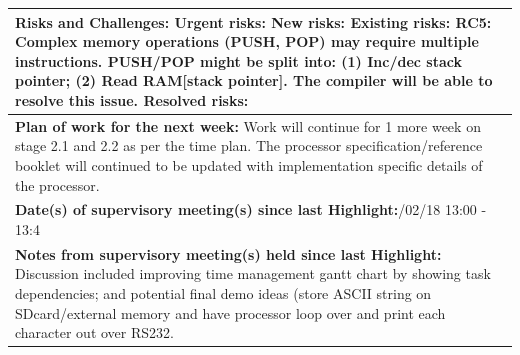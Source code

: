 \documentclass[11pt,a4paper]{article}
\begin{document}
\begin{table}[H]
\begin{tabularx}{\textwidth}{|X|}
	\\ \hline
	\textbf{Risks and Challenges:}\newline
	{\color{red} Urgent risks:}\newline
	{\color{orange} New risks:}\newline
	{\color{purple} Existing risks:\newline
	RC5: Complex memory operations (PUSH, POP) may require multiple instructions. PUSH/POP might be split into: (1) Inc/dec stack pointer; (2) Read RAM[stack pointer]. The compiler will be able to resolve this issue.}\newline
	{\color{gray} Resolved risks:}
	\\ \hline
	\textbf{Plan of work for the next week:}\newline
	Work will continue for 1 more week on stage 2.1 and 2.2 as per the time plan.
	\newline
	The processor specification/reference booklet will continued to be updated with implementation specific details of the processor.
	\\ \hline
	\textbf{Date(s) of supervisory meeting(s) since last Highlight:}\newline
	21/02/18 13:00 - 13:4
	\\ \hline
	\textbf{Notes from supervisory meeting(s) held since last Highlight:}\newline
	Discussion included improving time management gantt chart by showing task dependencies; and potential final demo ideas (store ASCII string on SDcard/external memory and have processor loop over and print each character out over RS232.
	\\ \hline
    \end{tabularx}
\end{table}

\newpage
\end{document}
